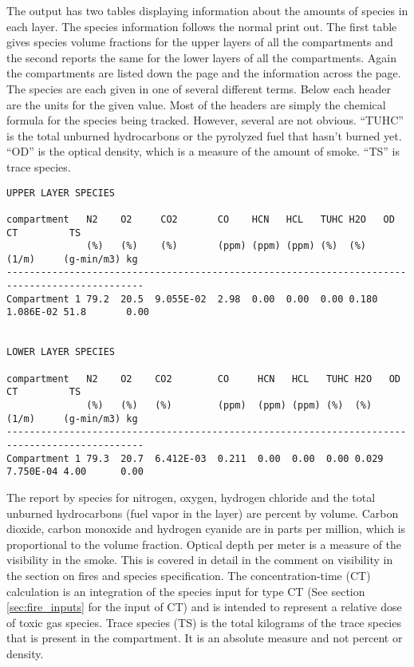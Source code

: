 The output has two tables displaying information about the amounts of species in each layer. The species information follows the normal print out.  The first table gives species volume fractions for the upper layers of all the compartments and the second reports the same for the lower layers of all the compartments.  Again the compartments are listed down the page and the information across the page.  The species are each given in one of several different terms.  Below each header are the units for the given value.  Most of the headers are simply the chemical formula for the species being tracked.  However, several are not obvious.  ``TUHC'' is the total unburned hydrocarbons or the pyrolyzed fuel that hasn't burned yet.  ``OD'' is the optical density, which is a measure of the amount of smoke. ``TS'' is trace species.

\begin{lstlisting}[basicstyle=\scriptsize]
UPPER LAYER SPECIES

compartment   N2    O2     CO2       CO    HCN   HCL   TUHC H2O   OD        CT         TS
              (%)   (%)    (%)       (ppm) (ppm) (ppm) (%)  (%)   (1/m)     (g-min/m3) kg
----------------------------------------------------------------------------------------------
Compartment 1 79.2  20.5  9.055E-02  2.98  0.00  0.00  0.00 0.180 1.086E-02 51.8       0.00


LOWER LAYER SPECIES

compartment   N2    O2    CO2        CO     HCN   HCL   TUHC H2O   OD        CT         TS
              (%)   (%)   (%)        (ppm)  (ppm) (ppm) (%)  (%)   (1/m)     (g-min/m3) kg
----------------------------------------------------------------------------------------------
Compartment 1 79.3  20.7  6.412E-03  0.211  0.00  0.00  0.00 0.029 7.750E-04 4.00      0.00
\end{lstlisting}
The report by species for nitrogen, oxygen, hydrogen chloride and the total unburned hydrocarbons (fuel vapor in the layer) are percent by volume. Carbon dioxide, carbon monoxide and hydrogen cyanide are in parts per million, which is proportional to the volume fraction.  Optical depth per meter is a measure of the visibility in the smoke. This is covered in detail in the comment on visibility in the section on fires and species specification. The concentration-time (CT) calculation is an integration of the species input for type CT (See section \ref{sec:fire_inputs} for the input of CT) and is intended to represent a relative dose of toxic gas species. Trace species (TS) is the total kilograms of the trace species that is present in the compartment. It is an absolute measure and not percent or density.


